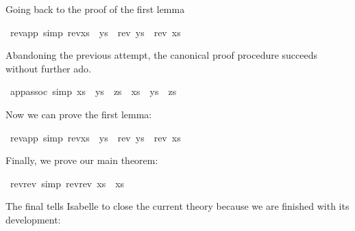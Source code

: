 \begin{isabellebody}
\begin{isamarkuptext}
Going back to the proof of the first lemma%
\end{isamarkuptext}%
\isamarkuptrue%
\ rev{\isacharunderscore}app\ {\isacharbrackleft}simp{\isacharbrackright}{\isacharcolon}\ {\isachardoublequote}rev{\isacharparenleft}xs\ {\isacharat}\ ys{\isacharparenright}\ {\isacharequal}\ {\isacharparenleft}rev\ ys{\isacharparenright}\ {\isacharat}\ {\isacharparenleft}rev\ xs{\isacharparenright}{\isachardoublequote}\isanewline
\isamarkupfalse%
\isamarkupfalse%
\isamarkupfalse%
\isamarkuptrue%
\isamarkupfalse%
%
\isamarkuptrue%
%
\begin{isamarkuptext}%
Abandoning the previous attempt, the canonical proof procedure
succeeds without further ado.%
\end{isamarkuptext}%
\isamarkuptrue%
\ app{\isacharunderscore}assoc\ {\isacharbrackleft}simp{\isacharbrackright}{\isacharcolon}\ {\isachardoublequote}{\isacharparenleft}xs\ {\isacharat}\ ys{\isacharparenright}\ {\isacharat}\ zs\ {\isacharequal}\ xs\ {\isacharat}\ {\isacharparenleft}ys\ {\isacharat}\ zs{\isacharparenright}{\isachardoublequote}\isanewline
\isamarkupfalse%
\isamarkupfalse%
\isamarkupfalse%
\isamarkupfalse%
%
\begin{isamarkuptext}%
\noindent
Now we can prove the first lemma:%
\end{isamarkuptext}%
\isamarkuptrue%
\ rev{\isacharunderscore}app\ {\isacharbrackleft}simp{\isacharbrackright}{\isacharcolon}\ {\isachardoublequote}rev{\isacharparenleft}xs\ {\isacharat}\ ys{\isacharparenright}\ {\isacharequal}\ {\isacharparenleft}rev\ ys{\isacharparenright}\ {\isacharat}\ {\isacharparenleft}rev\ xs{\isacharparenright}{\isachardoublequote}\isanewline
\isamarkupfalse%
\isamarkupfalse%
\isamarkupfalse%
\isamarkupfalse%
%
\begin{isamarkuptext}%
\noindent
Finally, we prove our main theorem:%
\end{isamarkuptext}%
\isamarkuptrue%
\ rev{\isacharunderscore}rev\ {\isacharbrackleft}simp{\isacharbrackright}{\isacharcolon}\ {\isachardoublequote}rev{\isacharparenleft}rev\ xs{\isacharparenright}\ {\isacharequal}\ xs{\isachardoublequote}\isanewline
\isamarkupfalse%
\isamarkupfalse%
\isamarkupfalse%
\isamarkupfalse%
%
\begin{isamarkuptext}%
\noindent
The final  tells Isabelle to close the current theory because
we are finished with its development:%
%
\end{isamarkuptext}%
\isamarkuptrue%
\isanewline
\isamarkupfalse%
\end{isabellebody}%
